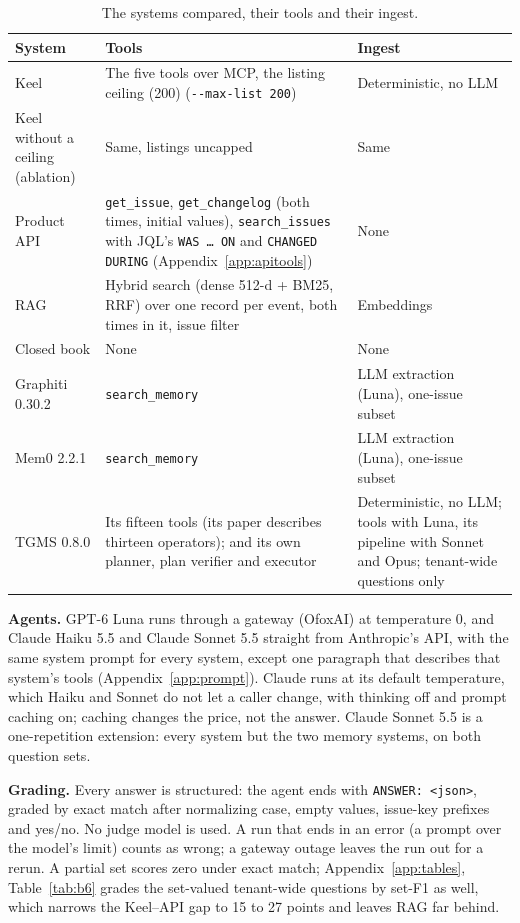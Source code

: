 \documentclass{article}
\newcommand{\code}[1]{\texttt{#1}}
\begin{document}
\begin{table}[t]
\caption{The systems compared, their tools and their ingest.}
\label{tab:systems}
\centering
\small
\begin{tabularx}{\textwidth}{P{1.45in} L P{1.55in}}
\toprule
System & Tools & Ingest \\
\midrule
Keel & The five tools over MCP, the listing ceiling (200) (\code{-{}-max-list 200}) & Deterministic, no LLM \\
Keel without a ceiling (ablation) & Same, listings uncapped & Same \\
Product API & \code{get\_issue}, \code{get\_changelog} (both times, initial values), \code{search\_issues} with JQL's \code{WAS\,\ldots\,ON} and \code{CHANGED DURING} (Appendix~\ref{app:apitools}) & None \\
RAG & Hybrid search (dense 512-d + BM25, RRF) over one record per event, both times in it, issue filter & Embeddings \\
Closed book & None & None \\
Graphiti 0.30.2 & \code{search\_memory} & LLM extraction (Luna), one-issue subset \\
Mem0 2.2.1 & \code{search\_memory} & LLM extraction (Luna), one-issue subset \\
TGMS 0.8.0 & Its fifteen tools (its paper describes thirteen operators); and its own planner, plan verifier and executor & Deterministic, no LLM; tools with Luna, its pipeline with Sonnet and Opus; tenant-wide questions only \\
\bottomrule
\end{tabularx}
\end{table}

\textbf{Agents.} GPT-6 Luna runs through a gateway (OfoxAI) at temperature 0, and Claude Haiku 5.5 and Claude Sonnet 5.5 straight from Anthropic's API, with the same system prompt for every system, except one paragraph that describes that system's tools (Appendix~\ref{app:prompt}). Claude runs at its default temperature, which Haiku and Sonnet do not let a caller change, with thinking off and prompt caching on; caching changes the price, not the answer. Claude Sonnet 5.5 is a one-repetition extension: every system but the two memory systems, on both question sets.

\textbf{Grading.} Every answer is structured: the agent ends with \code{ANSWER: <json>}, graded by exact match after normalizing case, empty values, issue-key prefixes and yes/no. No judge model is used. A run that ends in an error (a prompt over the model's limit) counts as wrong; a gateway outage leaves the run out for a rerun. A partial set scores zero under exact match; Appendix~\ref{app:tables}, Table~\ref{tab:b6} grades the set-valued tenant-wide questions by set-F1 as well, which narrows the Keel--API gap to 15 to 27 points and leaves RAG far behind.
\end{document}
